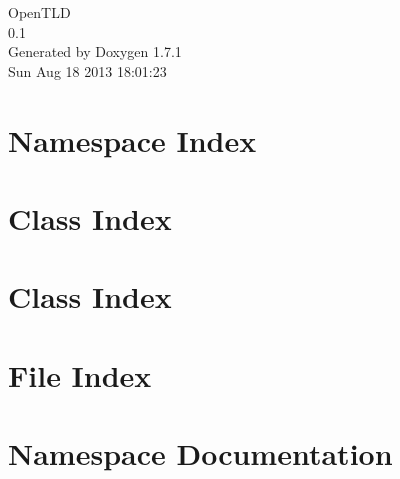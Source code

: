 \documentclass[a4paper]{book}
\begin{document}
\hypersetup{pageanchor=false}
\begin{titlepage}
\vspace*{7cm}
\begin{center}
{\Large OpenTLD \\[1ex]\large 0.1 }\\
\vspace*{1cm}
{\large Generated by Doxygen 1.7.1}\\
\vspace*{0.5cm}
{\small Sun Aug 18 2013 18:01:23}\\
\end{center}
\end{titlepage}
\clearemptydoublepage
{}
\tableofcontents
\clearemptydoublepage
{}
\hypersetup{pageanchor=true}
\chapter{Namespace Index}

\chapter{Class Index}

\chapter{Class Index}

\chapter{File Index}

\chapter{Namespace Documentation}


\end{document}
